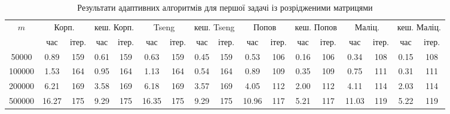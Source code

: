 \begin{table}[H]
    \centering
    \begin{tabular}{||c||c|c|c|c||c|c|c|c||c|c|c|c||c|c|c|c||} \hline \hline
        \multirow{2}{*}{$m$} & \multicolumn{2}{c|}{Корп.} & \multicolumn{2}{c||}{кеш. Корп.} & \multicolumn{2}{c|}{Tseng} & \multicolumn{2}{c||}{кеш. Tseng} & \multicolumn{2}{c|}{Попов} & \multicolumn{2}{c||}{кеш. Попов} & \multicolumn{2}{c|}{Маліц.} & \multicolumn{2}{c||}{кеш. Маліц.} \\ \cline{2-17}
         & час & ітер. & час & ітер. & час & ітер. & час & ітер. & час & ітер. & час & ітер. & час & ітер. & час & ітер. \\ \hline \hline
        50000 & 0.89 & 159 & 0.61 & 159 & 0.63 & 159 & 0.45 & 159 & 0.53 & 106 & 0.16 & 106 & 0.34 & 108 & 0.15 & 108 \\ \hline
        100000 & 1.53 & 164 & 0.95 & 164 & 1.13 & 164 & 0.54 & 164 & 0.89 & 109 & 0.35 & 109 & 0.75 & 111 & 0.31 & 111 \\ \hline
        200000 & 6.21 & 169 & 3.58 & 169 & 6.18 & 169 & 3.57 & 169 & 4.05 & 112 & 2.00 & 112 & 4.11 & 114 & 2.03 & 114 \\ \hline
        500000 & 16.27 & 175 & 9.29 & 175 & 16.35 & 175 & 9.29 & 175 & 10.96 & 117 & 5.21 & 117 & 11.03 & 119 & 5.22 & 119 \\ \hline
        \hline
    \end{tabular}
    \caption{Результати адаптивних алгоритмів для першої задачі із розрідженими матрицями}
    \label{tab:1-sparse-adapt}
\end{table}